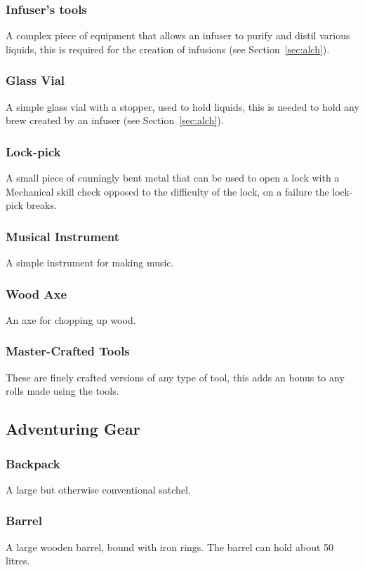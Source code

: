 \documentclass[a4paper,11pt,oneside]{book}
\newcommand{\textlf}[1]{\textbf{\titlecap{#1}}}
\begin{document}
\subsubsection*{Infuser's tools}
A complex piece of equipment that allows an infuser to purify and distil various liquids, this is required for the creation of infusions (see Section~\ref{sec:alch}).

\subsubsection*{Glass Vial}
A simple glass vial with a stopper, used to hold liquids, this is needed to hold any brew created by an infuser (see Section~\ref{sec:alch}).

\subsubsection*{Lock-pick}
A small piece of cunningly bent metal that can be used to open a lock with a Mechanical skill check opposed to the difficulty of the lock, on a failure the lock-pick breaks.

\subsubsection*{Musical Instrument}
A simple instrument for making music.

\subsubsection*{Wood Axe}
An axe for chopping up wood.

\subsubsection*{Master-Crafted Tools}
These are finely crafted versions of any type of tool, this adds an \textlf{edge} bonus to any rolls made using the tools.

\subsection{Adventuring Gear}

\subsubsection*{Backpack}
A large but otherwise conventional satchel.

\subsubsection*{Barrel}
A large wooden barrel, bound with iron rings. The barrel can hold about 50 litres.
\end{document}

